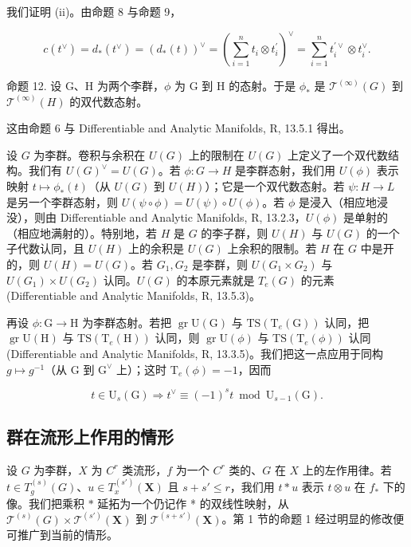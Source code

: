 我们证明 (ii)。由命题 8 与命题 9，

\[
c (t ^ {\vee}) = d _ {*} (t ^ {\vee}) = (d _ {*} (t)) ^ {\vee} = \left(\sum_ {i = 1} ^ {n} t _ {i} \otimes t _ {i} ^ {\prime}\right) ^ {\vee} = \sum_ {i = 1} ^ {n} t _ {i} ^ {\prime \vee} \otimes t _ {i} ^ {\vee}.
\]

命题 12. 设 G、H 为两个李群，\(\phi\) 为 G 到 H 的态射。于是 \(\phi_{*}\) 是 \(\mathcal{T}^{(\infty)}(G)\) 到 \(\mathcal{T}^{(\infty)}(H)\) 的双代数态射。

这由命题 6 与 Differentiable and Analytic Manifolds, R, 13.5.1 得出。

设 \(G\) 为李群。卷积与余积在 \(U(G)\) 上的限制在 \(U(G)\) 上定义了一个双代数结构。我们有 \(U(G)^{\vee} = U(G)\)。若 \(\phi: G \to H\) 是李群态射，我们用 \(U(\phi)\) 表示映射 \(t \mapsto \phi_{*}(t)\)（从 \(U(G)\) 到 \(U(H)\)）；它是一个双代数态射。若 \(\psi: H \to L\) 是另一个李群态射，则 \(U(\psi \circ \phi) = U(\psi) \circ U(\phi)\)。若 \(\phi\) 是浸入（相应地浸没），则由 Differentiable and Analytic Manifolds, R, 13.2.3，\(U(\phi)\) 是单射的（相应地满射的）。特别地，若 \(H\) 是 \(G\) 的李子群，则 \(U(H)\) 与 \(U(G)\) 的一个子代数认同，且 \(U(H)\) 上的余积是 \(U(G)\) 上余积的限制。若 \(H\) 在 \(G\) 中是开的，则 \(U(H) = U(G)\)。若 \(G_1, G_2\) 是李群，则 \(U(G_1 \times G_2)\) 与 \(U(G_1) \times U(G_2)\) 认同。\(U(G)\) 的本原元素就是 \(T_e(G)\) 的元素 (Differentiable and Analytic Manifolds, R, 13.5.3)。

再设 \(\phi: \mathrm{G} \to \mathrm{H}\) 为李群态射。若把 \(\operatorname{gr} \mathrm{U}(\mathrm{G})\) 与 \(\mathrm{TS}(\mathrm{T}_e(\mathrm{G}))\) 认同，把 \(\operatorname{gr} \mathrm{U}(\mathrm{H})\) 与 \(\mathrm{TS}(\mathrm{T}_e(\mathrm{H}))\) 认同，则 \(\operatorname{gr} \mathrm{U}(\phi)\) 与 \(\mathrm{TS}(\mathrm{T}_e(\phi))\) 认同 (Differentiable and Analytic Manifolds, R, 13.3.5)。我们把这一点应用于同构 \(g \mapsto g^{-1}\)（从 \(\mathrm{G}\) 到 \(\mathrm{G}^{\vee}\) 上）；这时 \(\mathrm{T}_e(\phi) = -1\)，因而

\[
t \in \mathrm{U} _ {s} (\mathrm{G}) \Rightarrow t ^ {\vee} \equiv (- 1) ^ {s} t \bmod \mathrm{U} _ {s - 1} (\mathrm{G}).\tag{3}
\]

\subsection{群在流形上作用的情形}

设 \(G\) 为李群，\(X\) 为 \(C^r\) 类流形，\(f\) 为一个 \(C^r\) 类的、\(G\) 在 \(X\) 上的左作用律。若 \(t \in T_g^{(s)}(G)\)、\(u \in T_x^{(s')}(\mathbf{X})\) 且 \(s + s' \leqslant r\)，我们用 \(t * u\) 表示 \(t \otimes u\) 在 \(f_*\) 下的像。我们把乘积 \(*\) 延拓为一个仍记作 * 的双线性映射，从 \(\mathcal{T}^{(s)}(G) \times \mathcal{T}^{(s')}(\mathbf{X})\) 到 \(\mathcal{T}^{(s+s')}(\mathbf{X})\)。第 1 节的命题 1 经过明显的修改便可推广到当前的情形。

